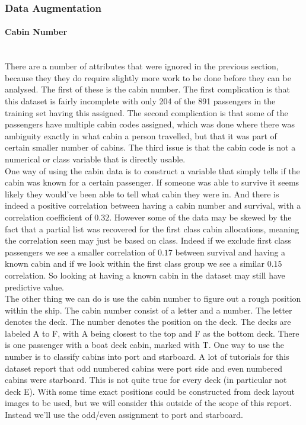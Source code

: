 \documentclass{llncs}
\begin{document}
\subsubsection{Data Augmentation}
\paragraph{Cabin Number}~\\
There are a number of attributes that were ignored in the previous section, because they they do require slightly more work to be done before they can be analysed. The first of these is the cabin number. The first complication is that this dataset is fairly incomplete with only 204 of the 891 passengers in the training set having this assigned. The second complication is that some of the passengers have multiple cabin codes assigned, which was done where there was ambiguity exactly in what cabin a person travelled, but that it was part of certain smaller number of cabins. The third issue is that the cabin code is not a numerical or class variable that is directly usable. \\
One way of using the cabin data is to construct a variable that simply tells if the cabin was known for a certain passenger. If someone was able to survive it seems likely they would've been able to tell what cabin they were in. And there is indeed a positive correlation between having a cabin number and survival, with a correlation coefficient of $0.32$. However some of the data may be skewed by the fact that a partial list was recovered for the first class cabin allocations\cite{cavelist}, meaning the correlation seen may just be based on class. Indeed if we exclude first class passengers we see a smaller correlation of $0.17$ between survival and having a known cabin and if we look within the first class group we see a similar $0.15$ correlation. So looking at having a known cabin in the dataset may still have predictive value.\\
The other thing we can do is use the cabin number to figure out a rough position within the ship. The cabin number consist of a letter and a number. The letter denotes the deck. The number denotes the position on the deck. The decks are labeled A to F, with A being closest to the top and F as the bottom deck. There is one passenger with a boat deck cabin, marked with T. One way to use the number is to classify cabins into port and starboard. A lot of tutorials for this dataset report that odd numbered cabins were port side and even numbered cabins were starboard. This is not quite true for every deck (in particular not deck E). With some time exact positions could be constructed from deck layout images to be used, but we will consider this outside of the scope of this report. Instead we'll use the odd/even assignment to port and starboard.\\
\end{document}
